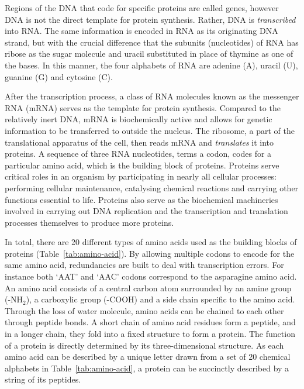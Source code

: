 Regions of the DNA that code for specific proteins are called genes, however DNA is not the direct template for protein synthesis. Rather, DNA is \emph{transcribed} into RNA. The same information is encoded in RNA as its originating DNA strand, but with the crucial difference that the subunits (nucleotides) of RNA has ribose as the sugar molecule and uracil substituted in place of thymine as one of the bases. In this manner, the four alphabets of RNA are adenine (A), uracil (U), guanine (G) and cytosine (C). 

After the transcription process, a class of RNA molecules known as the messenger RNA (mRNA) serves as the template for protein synthesis. Compared to the relatively inert DNA, mRNA is biochemically active and allows for genetic information to be transferred to outside the nucleus. The ribosome, a part of the translational apparatus of the cell, then reads mRNA and \emph{translates} it into proteins. A sequence of three RNA nucleotides, terms a codon, codes for a particular amino acid, which is the building block of proteins. Proteins serve critical roles in an organism by participating in nearly all cellular processes: performing cellular maintenance, catalysing chemical reactions and carrying other functions essential to life. Proteins also serve as the biochemical machineries involved in carrying out DNA replication and the transcription and translation processes themselves to produce more proteins. 

In total, there are 20 different types of amino acids used as the building blocks of proteins (Table~\ref{tab:amino-acid}). By allowing multiple codons to encode for the same amino acid, redundancies are built to deal with transcription errors. For instance both `AAT' and `AAC' codons correspond to the asparagine amino acid. An amino acid consists of a central carbon atom surrounded by an amine group (-NH$_2$), a carboxylic group (-COOH) and a side chain specific to the amino acid. Through the loss of water molecule, amino acids can be chained to each other through peptide bonds. A short chain of amino acid residues form a peptide, and in a longer chain, they fold into a fixed structure to form a protein. The function of a protein is directly determined by its three-dimensional structure. As each amino acid can be described by a unique letter drawn from a set of 20 chemical alphabets in Table~\ref{tab:amino-acid}, a protein can be succinctly described by a string of its peptides. 

